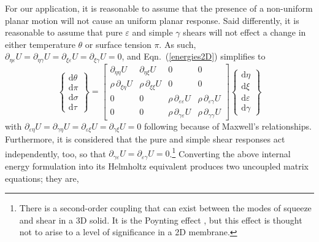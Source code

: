For our application, it is reasonable to assume that the presence of a non-uniform planar motion will not cause an uniform planar response.  Said differently, it is reasonable to assume that pure $\varepsilon$ and simple $\gamma$ shears will not effect a change in either temperature $\theta$ or surface tension $\pi$.  As such, $\partial_{\eta\varepsilon} U = \partial_{\eta\gamma} U = \partial_{\xi\varepsilon} U = \partial_{\xi\gamma} U = 0$, and Eqn.~(\ref{energies2D}) simplifies to
\begin{displaymath}
\left\{ \begin{matrix}
\mathrm{d} \theta \\ \mathrm{d} \pi \\
\mathrm{d} \sigma \\ \mathrm{d} \tau
\end{matrix} \right\} = \begin{bmatrix}
\partial_{\eta\eta} U & 
\partial_{\eta\xi} U & 
0 & 0 \\ 
\rho \, \partial_{\xi\eta} U & 
\rho \, \partial_{\xi\xi} U & 
0 & 0 \\
0 & 0 & 
\rho \, \partial_{\varepsilon\varepsilon} U & 
\rho \, \partial_{\varepsilon\gamma} U \\
0 & 0 & 
\rho \, \partial_{\gamma\varepsilon} U & 
\rho \, \partial_{\gamma\gamma} U 
\end{bmatrix} 
\left\{ \begin{matrix}
\mathrm{d}\eta \\ \mathrm{d} \xi \\
\mathrm{d} \varepsilon \\ \mathrm{d} \gamma
\end{matrix} \right\} 
\end{displaymath}
with $\partial_{\varepsilon\eta} U = \partial_{\gamma\eta} U = \partial_{\varepsilon\xi} U = \partial_{\gamma\xi} U = 0$ following because of Maxwell's relationships.  Furthermore, it is considered that the pure and simple shear responses act independently, too, so that $\partial_{\gamma\varepsilon} U = \partial_{\varepsilon\gamma} U = 0$.\footnote{
    There is a second-order coupling that can exist between the modes of squeeze and shear in a 3D solid.  It is the Poynting effect \cite{FreedZamani19}, but this effect is thought not to arise to a level of significance in a 2D membrane.
}
Converting the above internal energy formulation into its Helmholtz equivalent produces two uncoupled matrix equations; they are,
